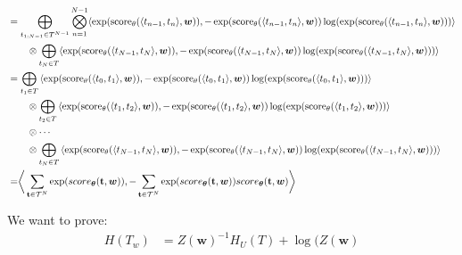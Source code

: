\documentclass[a4paper,12pt]{ETHexercise}
\begin{document}
\begin{question}
\begin{subquestion}
\begin{align}
			 & = \bigoplus_{t_{1:N-1} \in T^{N-1}} \overset{N-1}{\bigotimes_{n=1}} \langle \exp(\text{score}_{\theta}(\langle t_{n-1}, t_n \rangle, \boldsymbol{w})), -\exp(\text{score}_{\theta}(\langle t_{n-1}, t_n \rangle, \boldsymbol{w})) \log(\exp(\text{score}_{\theta}(\langle t_{n-1}, t_n \rangle, \boldsymbol{w}))) \rangle \nonumber                                                                                          \\
			 & \qquad \otimes \bigoplus_{t_{N} \in T} \langle \exp(\text{score}_{\theta}(\langle t_{N-1}, t_N \rangle, \boldsymbol{w})), -\exp(\text{score}_{\theta}(\langle t_{N-1}, t_N \rangle, \boldsymbol{w})) \log(\exp(\text{score}_{\theta}(\langle t_{N-1}, t_N \rangle, \boldsymbol{w}))) \rangle                                                                                                                                 \\
			 & = \bigoplus_{t_{1} \in T} \left\langle \exp(\text{score}_{\theta}(\langle t_0, t_1 \rangle, \boldsymbol{w})), -\exp(\text{score}_{\theta}(\langle t_0, t_1 \rangle, \boldsymbol{w})) \log(\exp(\text{score}_{\theta}(\langle t_0, t_1 \rangle, \boldsymbol{w}))) \right\rangle \nonumber                                                                                                                                     \\
			 & \qquad \otimes \bigoplus_{t_{2} \in T} \left\langle \exp(\text{score}_{\theta}(\langle t_1, t_2 \rangle, \boldsymbol{w})), -\exp(\text{score}_{\theta}(\langle t_1, t_2 \rangle, \boldsymbol{w})) \log(\exp(\text{score}_{\theta}(\langle t_1, t_2 \rangle, \boldsymbol{w}))) \right\rangle \nonumber                                                                                                                        \\
			 & \qquad \otimes \cdots \nonumber                                                                                                                                                                                                                                                 \\
			 & \qquad \otimes \bigoplus_{t_{N} \in T} \left\langle \exp(\text{score}_{\theta}(\langle t_{N-1}, t_N \rangle, \boldsymbol{w})), -\exp(\text{score}_{\theta}(\langle t_{N-1}, t_N \rangle, \boldsymbol{w})) \log(\exp(\text{score}_{\theta}(\langle t_{N-1}, t_N \rangle, \boldsymbol{w}))) \right\rangle \nonumber                                                                                                            \\
			 & = \biggr< \sum_{\mathbf{t} \in \mathcal{T}^N} \exp(score_{\boldsymbol{\theta}} (\mathbf{t},\boldsymbol{w})), -\sum_{\mathbf{t} \in \mathcal{T}^N} \exp(score_{\boldsymbol{\theta}} (\mathbf{t},\boldsymbol{w})) score_{\boldsymbol{\theta}} (\mathbf{t},\boldsymbol{w}) \biggr>
		\end{align}
	\end{subquestion}
	\begin{subquestion}
		We want to prove:\\
		\begin{align}
			H(T_w) & = Z(\boldsymbol{w})^{-1} H_U(T) + \log(Z(\boldsymbol{w})
		\end{align}

\end{subquestion}
\end{question}
\end{document}
